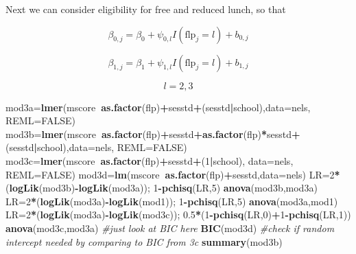 \documentclass[ignorenonframetext,]{beamer}
\newenvironment{Shaded}{\begin{snugshade}}{\end{snugshade}}
\newcommand{\KeywordTok}[1]{\textcolor[rgb]{0.13,0.29,0.53}{\textbf{#1}}}
\newcommand{\DataTypeTok}[1]{\textcolor[rgb]{0.13,0.29,0.53}{#1}}
\newcommand{\DecValTok}[1]{\textcolor[rgb]{0.00,0.00,0.81}{#1}}
\newcommand{\FloatTok}[1]{\textcolor[rgb]{0.00,0.00,0.81}{#1}}
\newcommand{\StringTok}[1]{\textcolor[rgb]{0.31,0.60,0.02}{#1}}
\newcommand{\CommentTok}[1]{\textcolor[rgb]{0.56,0.35,0.01}{\textit{#1}}}
\newcommand{\OtherTok}[1]{\textcolor[rgb]{0.56,0.35,0.01}{#1}}
\newcommand{\OperatorTok}[1]{\textcolor[rgb]{0.81,0.36,0.00}{\textbf{#1}}}
\newcommand{\NormalTok}[1]{#1}
\begin{document}
\begin{frame}[fragile]{}

Next we can consider eligibility for free and reduced lunch, so that

\[\beta_{0,j}=\beta_0+\psi_{0,l}I(\text{flp}_j=l)+b_{0,j}\]

\[\beta_{1,j}=\beta_1+\psi_{1,l}I(\text{flp}_j=l)+b_{1,j}\]

\[l=2,3\]

\begin{Shaded}
\begin{Highlighting}[]
\NormalTok{mod3a=}\KeywordTok{lmer}\NormalTok{(mscore}\OperatorTok{~}\KeywordTok{as.factor}\NormalTok{(flp)}\OperatorTok{+}\NormalTok{sesstd}\OperatorTok{+}\NormalTok{(sesstd}\OperatorTok{|}\NormalTok{school),}\DataTypeTok{data=}\NormalTok{nels, }\DataTypeTok{REML=}\OtherTok{FALSE}\NormalTok{)}
\NormalTok{mod3b=}\KeywordTok{lmer}\NormalTok{(mscore}\OperatorTok{~}\KeywordTok{as.factor}\NormalTok{(flp)}\OperatorTok{+}\NormalTok{sesstd}\OperatorTok{+}\KeywordTok{as.factor}\NormalTok{(flp)}\OperatorTok{*}\NormalTok{sesstd}\OperatorTok{+}
\StringTok{             }\NormalTok{(sesstd}\OperatorTok{|}\NormalTok{school),}\DataTypeTok{data=}\NormalTok{nels, }\DataTypeTok{REML=}\OtherTok{FALSE}\NormalTok{)}
\NormalTok{mod3c=}\KeywordTok{lmer}\NormalTok{(mscore}\OperatorTok{~}\KeywordTok{as.factor}\NormalTok{(flp)}\OperatorTok{+}\NormalTok{sesstd}\OperatorTok{+}\NormalTok{(}\DecValTok{1}\OperatorTok{|}\NormalTok{school),}
           \DataTypeTok{data=}\NormalTok{nels, }\DataTypeTok{REML=}\OtherTok{FALSE}\NormalTok{)}
\NormalTok{mod3d=}\KeywordTok{lm}\NormalTok{(mscore}\OperatorTok{~}\KeywordTok{as.factor}\NormalTok{(flp)}\OperatorTok{+}\NormalTok{sesstd,}\DataTypeTok{data=}\NormalTok{nels)}
\NormalTok{LR=}\DecValTok{2}\OperatorTok{*}\NormalTok{(}\KeywordTok{logLik}\NormalTok{(mod3b)}\OperatorTok{-}\KeywordTok{logLik}\NormalTok{(mod3a)); }\DecValTok{1}\OperatorTok{-}\KeywordTok{pchisq}\NormalTok{(LR,}\DecValTok{5}\NormalTok{)}
\KeywordTok{anova}\NormalTok{(mod3b,mod3a)}
\NormalTok{LR=}\DecValTok{2}\OperatorTok{*}\NormalTok{(}\KeywordTok{logLik}\NormalTok{(mod3a)}\OperatorTok{-}\KeywordTok{logLik}\NormalTok{(mod1)); }\DecValTok{1}\OperatorTok{-}\KeywordTok{pchisq}\NormalTok{(LR,}\DecValTok{5}\NormalTok{)}
\KeywordTok{anova}\NormalTok{(mod3a,mod1)}
\NormalTok{LR=}\DecValTok{2}\OperatorTok{*}\NormalTok{(}\KeywordTok{logLik}\NormalTok{(mod3a)}\OperatorTok{-}\KeywordTok{logLik}\NormalTok{(mod3c)); }\FloatTok{0.5}\OperatorTok{*}\NormalTok{(}\DecValTok{1}\OperatorTok{-}\KeywordTok{pchisq}\NormalTok{(LR,}\DecValTok{0}\NormalTok{)}\OperatorTok{+}\DecValTok{1}\OperatorTok{-}\KeywordTok{pchisq}\NormalTok{(LR,}\DecValTok{1}\NormalTok{))}
\KeywordTok{anova}\NormalTok{(mod3c,mod3a) }\CommentTok{#just look at BIC here}
\KeywordTok{BIC}\NormalTok{(mod3d) }\CommentTok{#check if random intercept needed by comparing to BIC from 3c}
\KeywordTok{summary}\NormalTok{(mod3b)}
\end{Highlighting}
\end{Shaded}

\end{frame}
\end{document}
